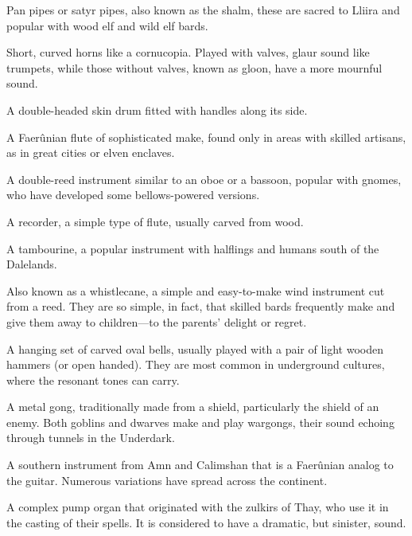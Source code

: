 \documentclass[10pt,a4paper,twoside,twocolumn,openany,bg=print,nodeprecatedcode]{dndbook}
\begin{document}
\begin{description}[nolistsep]
\item[Birdpipes:]
Pan pipes or satyr pipes, also known as the shalm, these are sacred to Lliira and popular with wood elf and wild elf bards.
\item[Glaur:]
Short, curved horns like a cornucopia. Played with valves, glaur sound like trumpets, while those without valves, known as gloon, have a more mournful sound.
\item[Hand Drum:]
A double-headed skin drum fitted with handles along its side.
\item[Longhorn:]
A Faerûnian flute of sophisticated make, found only in areas with skilled artisans, as in great cities or elven enclaves.
\item[Shawm:]
A double-reed instrument similar to an oboe or a bassoon, popular with gnomes, who have developed some bellows-powered versions.
\item[Songhorn:]
A recorder, a simple type of flute, usually carved from wood.
\item[Tantan:]
A tambourine, a popular instrument with halflings and humans south of the Dalelands.
\item[Thelarr:]
Also known as a whistlecane, a simple and easy-to-make wind instrument cut from a reed. They are so simple, in fact, that skilled bards frequently make and give them away to children—to the parents' delight or regret.
\item[Tocken:]
A hanging set of carved oval bells, usually played with a pair of light wooden hammers (or open handed). They are most common in underground cultures, where the resonant tones can carry.
\item[Wargong:]
A metal gong, traditionally made from a shield, particularly the shield of an enemy. Both goblins and dwarves make and play wargongs, their sound echoing through tunnels in the Underdark.
\item[Yarting:]
A southern instrument from Amn and Calimshan that is a Faerûnian analog to the guitar. Numerous variations have spread across the continent.
\item[Zulkoon:]
A complex pump organ that originated with the zulkirs of Thay, who use it in the casting of their spells. It is considered to have a dramatic, but sinister, sound.
\end{description}
\end{document}
